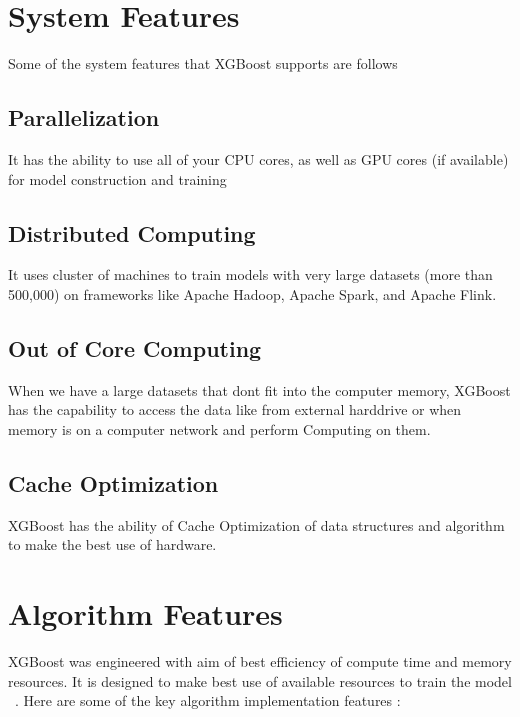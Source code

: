 \section{System Features}

Some of the system features that XGBoost supports are follows 

\subsection{Parallelization}

It has the ability to use all of your CPU cores, as well as GPU cores (if
available) for model construction and training

\subsection{Distributed Computing}

It uses cluster of machines to train models with very large datasets (more than
500,000) on frameworks like Apache Hadoop, Apache Spark, and Apache Flink.

\subsection{Out of Core Computing}

When we have a large datasets that dont fit into the computer memory, XGBoost
has the capability to access the data  like from external harddrive or when
memory is on a computer network and perform Computing on them.

\subsection{Cache Optimization}

XGBoost has the ability of Cache Optimization of data structures and algorithm 
to make the best use of hardware.



\section{Algorithm Features} 

XGBoost was engineered with aim of best efficiency of compute time and memory
resources. It is designed to make best use of available resources to train the
model ~\cite{hid-sp18-401-XGBoost-MLmastery}. Here are some of the key algorithm 
implementation features :

